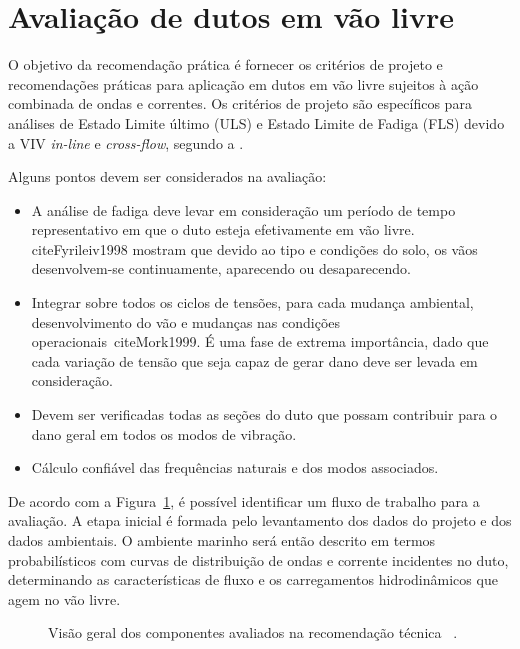 \section{Avaliação de dutos em vão livre}

O objetivo da recomendação prática  é fornecer os critérios de projeto e recomendações práticas para aplicação em dutos em vão livre sujeitos à ação combinada de ondas e correntes.
Os critérios de projeto são específicos para análises de Estado Limite último (ULS) e Estado Limite de Fadiga (FLS) devido a VIV \textit{in-line} e \textit{cross-flow}, segundo a .

Alguns pontos devem ser considerados na avaliação:
\begin{itemize}
\item A análise de fadiga deve levar em consideração um período de tempo representativo em que o duto esteja efetivamente em vão livre.
cite{Fyrileiv1998} mostram que devido ao tipo e condições do solo, os vãos desenvolvem-se continuamente, aparecendo ou desaparecendo.

\item Integrar sobre todos os ciclos de tensões, para cada mudança ambiental, desenvolvimento do vão e mudanças nas condições operacionais~cite{Mork1999}. É uma fase de extrema importância, dado que cada variação de tensão que seja capaz de gerar dano deve ser levada em consideração.

\item Devem ser verificadas todas as seções do duto que possam contribuir para o dano geral em todos os modos de vibração.

\item Cálculo confiável das frequências naturais e dos modos associados.
\end{itemize}

De acordo com a Figura~\ref{fig:viv-dnvchart}, é possível identificar um fluxo de trabalho para a avaliação.
A etapa inicial é formada pelo levantamento dos dados do projeto e dos dados ambientais.
O ambiente marinho será então descrito em termos probabilísticos com curvas de distribuição de ondas e corrente incidentes no duto, determinando as características de fluxo e os carregamentos hidrodinâmicos que agem no vão livre.

\begin{figure}[hbt!]
\begin{center}
\caption{Visão geral dos componentes avaliados na recomendação técnica ~\cite{DNV2017}.}
\label{fig:viv-dnvchart}
\end{center}
\end{figure}

